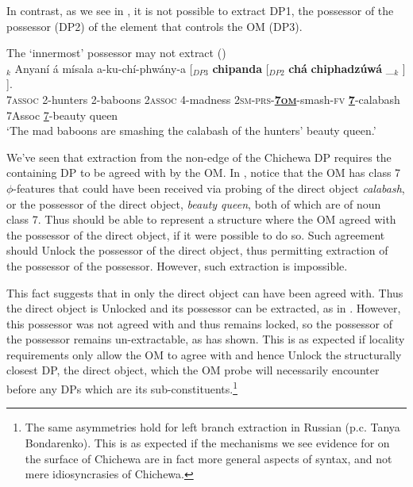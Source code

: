 \documentclass[output=paper,colorlinks,citecolor=brown]{langscibook}
\begin{document}
In contrast, as we see in , it is not possible to extract DP1, the possessor of the possessor (DP2) of the element that controls the OM (DP3).

\ea%
    \label{ex:branan:16}
    The `innermost' possessor may not extract \hfill{(\citealt[61, ex. 32]{Mchombo2004})}\\
    $_{k}$  Anyaní á mísala a-ku-chí-phwány-a [$_{DP3}$ \textbf{chipanda}  [$_{DP2}$ \textbf{chá}  \textbf{chiphadz\'{u}w\'{a}} \_$_{k}$ ] ].  \\
            {} 7\textsc{assoc} 2-hunters   2-baboons 2\textsc{assoc} 4-madness 2\textsc{sm-prs}-\textbf{\underline{7\textsc{om}}}-smash-\textsc{fv} {} \textbf{\underline{7}}-calabash {} 7Assoc {\underline{7}-beauty queen} {} {} {}  \\
    \glt    `The mad baboons are smashing the calabash of the hunters’ beauty queen.'
\z

We've seen that extraction from the non-edge of the Chichewa DP requires the containing DP to be agreed with by the OM. In , notice that the OM has class 7 $\phi$-features that could have been received via probing of the direct object \textit{calabash}, or the possessor of the direct object, \textit{beauty queen}, both of which are of noun class 7. Thus  should be able to represent a structure where the OM agreed with the possessor of the direct object, if it were possible to do so. Such agreement should Unlock the possessor of the direct object, thus permitting extraction of the possessor of the possessor. However, such extraction is impossible.


This fact suggests that in  only the direct object can have been agreed with. Thus the direct object is Unlocked and its possessor can be extracted, as in . However, this possessor was not agreed with and thus remains locked, so the possessor of the possessor remains un-extractable, as  has shown. This is as expected if locality requirements only allow the OM to agree with and hence Unlock the structurally closest DP, the direct object, which the OM probe will necessarily encounter before any DPs which are its sub-constituents.\footnote{The same asymmetries hold for left branch extraction in Russian (p.c. Tanya Bondarenko). This is as expected if the mechanisms we see evidence for on the surface of Chichewa are in fact more general aspects of syntax, and not mere idiosyncrasies of Chichewa.}
\end{document}
